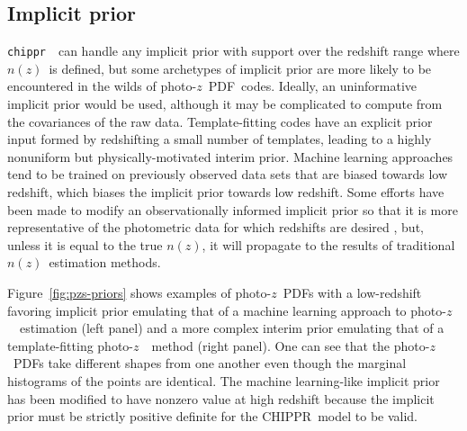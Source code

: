 \documentclass[iop]{emulateapj}
\newcommand{\todo}[3]{{\color{#2}\emph{#1}: #3}}
\newcommand{\aim}[1]{\todo{AIM}{red}{#1}}
\newcommand{\Fig}[1]{Figure~\ref{#1}}
\newcommand{\project}[1]{{\textsc{#1}}}
\newcommand{\Chippr}{\project{CHIPPR}}
\newcommand{\repo}[1]{{\texttt{#1}}~}
\newcommand{\chippr}{\repo{chippr}}
\newcommand{\nz}{$n(z)$}
\newcommand{\pz}{photo-$z$~}
\newcommand{\pzpdf}{\pz PDF}
\begin{document}
\subsection{Implicit prior}
\label{sec:interim}

\chippr\ can handle any implicit prior with support over the redshift range where \nz\ is defined, but some archetypes of implicit prior are more likely to be encountered in the wilds of \pzpdf\ codes.
Ideally, an uninformative implicit prior would be used, although it may be complicated to compute from the covariances of the raw data.  
Template-fitting codes have an explicit prior input formed by redshifting a small number of templates, leading to a highly nonuniform but physically-motivated interim prior.
Machine learning approaches tend to be trained on previously observed data sets that are biased towards low redshift, which biases the implicit prior towards low redshift.
Some efforts have been made to modify an observationally informed implicit prior so that it is more representative of the photometric data for which redshifts are desired \citep{sheldon_photometric_2012}, but, unless it is equal to the true \nz, it will propagate to the results of traditional \nz\ estimation methods.  

\Fig{fig:pzs-priors} shows examples of \pzpdf s with a low-redshift favoring implicit prior emulating that of a machine learning approach to \pz\ estimation (left panel) and a more complex interim prior emulating that of a template-fitting \pz\ method (right panel).
One can see that the \pzpdf s take different shapes from one another even though the marginal histograms of the points are identical.
The machine learning-like implicit prior has been modified to have nonzero value at high redshift because the implicit prior must be strictly positive definite for the \Chippr\ model to be valid.
\end{document}
